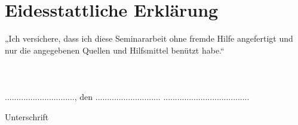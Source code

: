 \documentclass[12pt]{scrartcl} %
\begin{document}
\newpage
\section*{Eidesstattliche Erklärung}
\vfill
„Ich versichere, dass ich diese Seminararbeit ohne fremde Hilfe angefertigt und nur die angegebenen Quellen und Hilfsmittel benützt habe.“\\
\\
\\
\\
.............................., den ............................ \hfill .....................................\\
\begin{flushright}
Unterschrift
\end{flushright}
\end{document}
